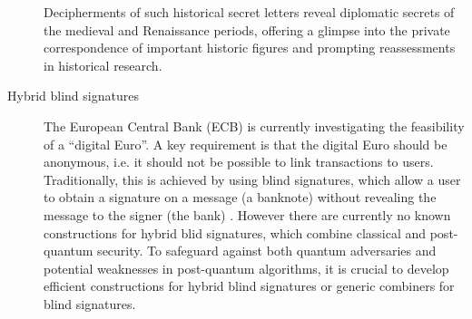 \documentclass{article}
\begin{document}
\begin{description}
 Decipherments of such historical secret letters
 reveal diplomatic secrets of the medieval and Renaissance periods, offering a glimpse into the private correspondence of important historic figures and prompting reassessments in historical research.
    \item[Hybrid blind signatures] The European Central Bank (ECB) is currently investigating the feasibility of a ``digital Euro''. A key requirement is that the digital Euro should be anonymous, i.e. it should not be possible to link transactions to users. Traditionally, this is achieved by using blind signatures, which allow a user to obtain a signature on a message (a banknote) without revealing the message to the signer (the bank) \cite{Chaum82}. However there are currently no known constructions for hybrid blid signatures, which combine classical and post-quantum security. To safeguard against both quantum adversaries and potential weaknesses in post-quantum algorithms,  it is crucial to develop efficient constructions for hybrid blind signatures or generic combiners for blind signatures.

\end{description}


\end{document}
